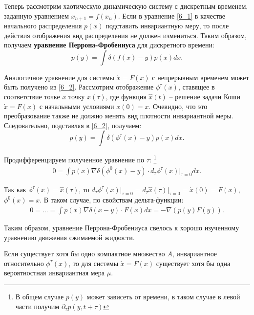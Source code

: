 Теперь рассмотрим хаотическую динамическую систему с дискретным временем, заданную уравнением $x_{n+1} = f\left( x_n \right)$.
Если в уравнение \eqref{6_1} в качестве начального распределения $p(x)$ подставить инвариантную меру, то после действия отображения вид распределения не должен измениться.
Таким образом, получаем \textbf{уравнение Перрона-Фробениуса} для дискретного времени:
\begin{equation}
\label{6_2}
    p\left( y \right) = \int \delta\left( f(x) - y \right) p\left( x \right) dx.
\end{equation}

Аналогичное уравнение для системы $\dot{x} = F(x)$ с непрерывным временем может быть получено из \eqref{6_2}.
Рассмотрим отображение $\phi^\tau(x)$, ставящее в соответствие точке $x$ точку $\hat{x}(\tau)$, где функция $\hat{x}(t)$ -- решение задачи Коши $\dot{x} = F(x)$ с начальными условиями $x(0) = x$.
Очевидно, что это преобразование также не должно менять вид плотности инвариантной меры.
Следовательно, подставляя в \eqref{6_2}, получаем:
\begin{equation*}
    p\left( y \right) = \int \delta\left( \phi^\tau(x) - y \right) p\left( x \right) dx.
\end{equation*}

Продифференцируем полученное уравнение по $\tau$:
\footnote{В общем случае $p(y)$ может зависеть от времени, в таком случае в левой части получим $\partial_\tau p(y, t+\tau)$}
\begin{gather*}
    0 =
    \int p(x) \nabla \delta\left( \phi^0\left( x \right) - y \right) \cdot d_\tau \phi^\tau(x) \big|_{\tau=0} dx.
\end{gather*}

Так как $\phi^{\tau}(x) = \hat{x}(\tau)$, то $d_\tau \phi^\tau(x) \big|_{\tau=0} = d_\tau \hat{x}(\tau) \big|_{\tau=0} = \dot{x}(0) = F(x)$, $\phi^0(x) = x$. В таком случае, по свойствам дельта-функции:
\begin{gather*}
    0 = \dots =
    \int p(x) \nabla \delta\left( x - y \right) \cdot F(x) dx =
    -\nabla\left( p(y) F(y) \right).
\end{gather*}

Таким образом, уравнение Перрона-Фробениуса свелось к хорошо изученному уравнению движения сжимаемой жидкости.

\begin{theorem}
    Если существует хотя бы одно компактное множество $A$, инвариантное относительно $\phi^\tau(x)$, то для системы $\dot x = F(x)$ существует хотя бы одна вероятностная инвариантная мера $\mu$.
\end{theorem}

